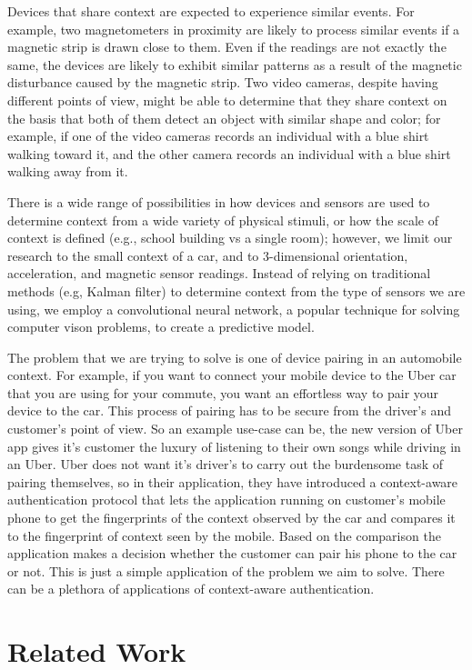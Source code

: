 \documentclass[journal]{IEEEtranTIE}
\begin{document}
Devices that share context are expected to experience similar events. For
example, two magnetometers in proximity are likely to process similar events
if a magnetic strip is drawn close to them. Even if the readings are not exactly
the same, the devices are likely to exhibit similar patterns as a result of the
magnetic disturbance caused by the magnetic strip. Two video cameras, despite
having different points of view, might be able to determine that they share
context on the basis that both of them detect an object with similar shape and
color; for example, if one of the video cameras records an individual with a
blue shirt walking toward it, and the other camera records an individual with a
blue shirt walking away from it.

There is a wide range of possibilities in how devices and sensors are used to
determine context from a wide variety of physical stimuli, or how the scale of
context is defined (e.g., school building vs a single room); however, we limit
our research to the small context of a car, and to 3-dimensional orientation,
acceleration, and magnetic sensor readings. Instead of relying on traditional
methods (e.g, Kalman filter) to determine context from the type of sensors we
are using, we employ a convolutional neural network, a popular technique for
solving computer vison problems, to create a predictive model.

The problem that we are trying to solve is one of device pairing in an
automobile context.  For example, if you want to connect your mobile device to
the Uber car that you are using for your commute, you want an effortless way to
pair your device to the car. This process of pairing has to be secure from the
driver's and customer's point of view. So an example use-case can be, the new
version of Uber app gives it's customer the luxury of listening to their own
songs while driving in an Uber. Uber does not want it's driver's to carry out
the burdensome task of pairing themselves, so in their application, they have
introduced a context-aware authentication protocol that lets the application
running on customer's mobile phone to get the fingerprints of the context
observed by the car and compares it to the fingerprint of context seen by the
mobile. Based on the comparison the application makes a decision whether the
customer can pair his phone to the car or not. This is just a simple application
of the problem we aim to solve. There can be a plethora of applications of
context-aware authentication.

\section{Related Work}
\end{document}
